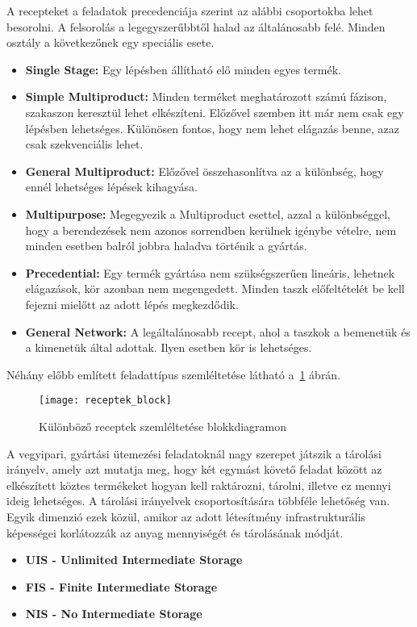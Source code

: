 A recepteket a feladatok precedenciája szerint az alábbi csoportokba lehet besorolni.
A felsorolás a legegyszerűbbtől halad az általánosabb felé.
Minden osztály a következőnek egy speciális esete.
\begin{itemize}
	\item \textbf{Single Stage:} Egy lépésben állítható elő minden egyes termék.
	\item \textbf{Simple Multiproduct:} Minden terméket meghatározott számú fázison, szakaszon keresztül lehet elkészíteni.
	Előzővel szemben itt már nem csak egy lépésben lehetséges.
	Különösen fontos, hogy nem lehet elágazás benne, azaz csak szekvenciális lehet.
	\item \textbf{General Multiproduct:} Előzővel összehasonlítva az a különbség, hogy ennél lehetséges lépések kihagyása.
	\item \textbf{Multipurpose:} Megegyezik a Multiproduct esettel, azzal a különbséggel, hogy a berendezések nem azonos sorrendben kerülnek igénybe vételre, nem minden esetben balról jobbra haladva történik a gyártás.	
	\item \textbf{Precedential:} Egy termék gyártása nem szükségszerűen lineáris, lehetnek elágazások, kör azonban nem megengedett.
	Minden taszk előfeltételét be kell fejezni mielőtt az adott lépés megkezdődik. 
	\item \textbf{General Network:} A legáltalánosabb recept, ahol a taszkok a bemenetük és a kimenetük által adottak.
	Ilyen esetben kör is lehetséges.
\end{itemize}

Néhány előbb említett feladattípus szemléltetése látható a~\ref{receptek_block} ábrán.
\begin{figure}[H]	
\begin{center}
\texttt{[image: receptek\_block]}
\caption{Különböző receptek szemléltetése blokkdiagramon}
\label{receptek_block}
\end{center}
\end{figure}

\newpage
A vegyipari, gyártási ütemezési feladatoknál nagy szerepet játszik a tárolási irányelv, amely azt mutatja meg, hogy két egymást követő feladat között az elkészített köztes termékeket hogyan kell raktározni, tárolni, illetve ez mennyi ideig lehetséges.
A tárolási irányelvek csoportosítására többféle lehetőség van.
Egyik dimenzió ezek közül, amikor az adott létesítmény infrastrukturális képességei korlátozzák az anyag mennyiségét és tárolásának módját.
\begin{itemize}
	\item \textbf{UIS - Unlimited Intermediate Storage}
	\item \textbf{FIS - Finite Intermediate Storage}
	\item \textbf{NIS - No Intermediate Storage}
\end{itemize}

